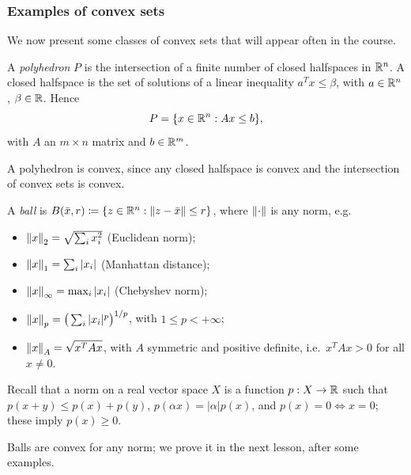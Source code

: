 \subsubsection{Examples of convex sets}

We now present some classes of convex sets that will appear often in the course.

\begin{definition}[Polyhedron]
A \emph{polyhedron} $P$ is the intersection of a finite number of closed halfspaces in $\mathbb{R}^n$. A closed halfspace is the set of solutions of a linear inequality $a^Tx \le \beta$, with $a \in \mathbb{R}^n$, $\beta \in \mathbb{R}$. Hence
\[
    P = \{x \in \mathbb{R}^n : Ax \le b\},
\]
with $A$ an $m \times n$ matrix and $b \in \mathbb{R}^m$.
\end{definition}

A polyhedron is convex, since any closed halfspace is convex and the intersection of convex sets is convex.

\begin{definition}[Ball]
A \emph{ball} is $B(\bar{x}, r) \coloneqq \{z \in \mathbb{R}^n : \left\lVert z - \bar{x} \right\rVert \le r\}$, where $\left\lVert \cdot \right\rVert$ is any norm, e.g.
\begin{itemize}
    \item $\left\lVert x \right\rVert_2 = \sqrt{\sum_i x_i^2}$ (Euclidean norm);
    \item $\left\lVert x \right\rVert_1 = \sum_i |x_i|$ (Manhattan distance);
    \item $\left\lVert x \right\rVert_\infty = \max_i |x_i|$ (Chebyshev norm);
    \item $\left\lVert x \right\rVert_p = \big(\sum_i |x_i|^p\big)^{1/p}$, with $1 \le p < +\infty$;
    \item $\left\lVert x \right\rVert_A = \sqrt{x^TAx}$, with $A$ symmetric and positive definite, i.e.\ $x^TAx > 0$ for all $x \neq 0$.
\end{itemize}
\end{definition}

Recall that a norm on a real vector space $X$ is a function $p: X \to \mathbb{R}$ such that $p(x+y) \le p(x) + p(y)$, $p(\alpha x) = |\alpha| p(x)$, and $p(x) = 0 \Leftrightarrow x = 0$; these imply $p(x) \ge 0$.

Balls are convex for any norm; we prove it in the next lesson, after some examples.
